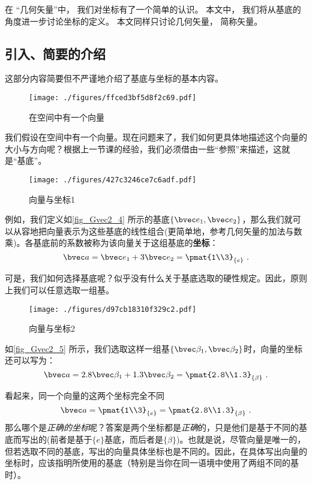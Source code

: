 

在 “几何矢量”中， 我们对坐标有了一个简单的认识。 本文中， 我们将从基底的角度进一步讨论坐标的定义。 本文同样只讨论几何矢量， 简称矢量。

\subsection{引入、简要的介绍}
这部分内容简要但不严谨地介绍了基底与坐标的基本内容。
\begin{figure}[ht]
\centering
\texttt{[image: ./figures/ffced3bf5d8f2c69.pdf]}
\caption{在空间中有一个向量} \label{fig_Gvec2_3}
\end{figure}

我们假设在空间中有一个向量。现在问题来了，我们如何更具体地描述这个向量的大小与方向呢？根据上一节课的经验，我们必须借由一些“参照”来描述，这就是“基底”。

\begin{figure}[ht]
\centering
\texttt{[image: ./figures/427c3246ce7c6adf.pdf]}
\caption{向量与坐标1} \label{fig_Gvec2_4}
\end{figure}
例如，我们定义如\autoref{fig_Gvec2_4} 所示的基底$\{\bvec e_1,\bvec e_2\}$，那么我们就可以从容地把向量表示为这些基底的线性组合(更简单地，参考几何矢量的加法与数乘)。各基底前的系数被称为该向量关于这组基底的\textbf{坐标}：
$$\bvec a = \bvec e_1 + 3\bvec e_2=
\pmat{1\\3}_{\{e\}}~.$$

可是，我们如何选择基底呢？似乎没有什么关于基底选取的硬性规定。因此，原则上我们可以任意选取一组基。
\begin{figure}[ht]
\centering
\texttt{[image: ./figures/d97cb18310f329c2.pdf]}
\caption{向量与坐标2} \label{fig_Gvec2_5}
\end{figure}
如\autoref{fig_Gvec2_5} 所示，我们选取这样一组基$\{\bvec \beta_1,\bvec \beta_2\}$时，向量的坐标还可以写为：
$$\bvec a = 2.8 \bvec \beta_1 + 1.3 \bvec \beta_2=
\pmat{2.8\\1.3}_{\{\beta\}}~.$$

看起来，同一个向量的这两个坐标完全不同
$$\bvec a = \pmat{1\\3}_{\{e\}} =
\pmat{2.8\\1.3}_{\{\beta\}}~.$$
那么哪个是\textsl{正确的坐标}呢？答案是两个坐标都是\textsl{正确}的，只是他们是基于不同的基底而写出的(前者是基于$\{e\}$基底，而后者是$\{\beta\}$)。也就是说，尽管向量是唯一的，但若选取不同的基底，写出的向量具体坐标也是不同的。因此，在具体写出向量的坐标时，应该指明所使用的基底（特别是当你在同一语境中使用了两组不同的基时）。

